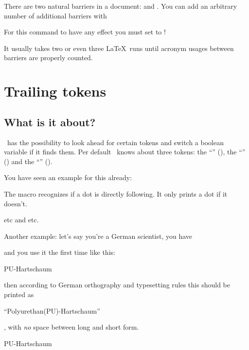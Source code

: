\documentclass{acro-manual}
\begin{document}
There are two natural barriers in a document: \beginenv*{} and
\endenv*{}. You can add an arbitrary number of additional
barriers with
\begin{commands}
    For this command to have any effect you must set
    \code{/} to !
\end{commands}
\begin{bewareofthedog}
  It usually takes two or even three \LaTeX\ runs until acronym usages
  between barriers are properly counted.
\end{bewareofthedog}

\section{Trailing tokens}\label{sec:trailing-tokens}
\subsection{What is it about?}
\acro\ has the possibility to look ahead for certain tokens and switch a
boolean variable if it finds them.  Per default \acro\ knows about three
tokens: the \enquote{} (), the \enquote{}
(\sym{-}) and the \enquote{} ().

You have seen an example for this already:
\begin{sourcecode}
\end{sourcecode}
The macro  recognizes if a dot is directly following. It only prints
a dot if it doesn't.
\begin{example}
  \ac{etc} and \ac{etc}.
\end{example}

Another example: let's say you're a German scientist, you have
\begin{sourcecode}
\end{sourcecode}
and you use it the first time like this:
\begin{sourcecode}
  \ac{PU}-Hartschaum
\end{sourcecode}
then according to German orthography and typesetting rules this should be
printed as
\begin{center}
  \enquote{Polyurethan(PU)-Hartschaum}
\end{center}
\ie, with \emph{no} space between long and short form.
\begin{example}
  \acf{PU}-Hartschaum
\end{example}
\end{document}
